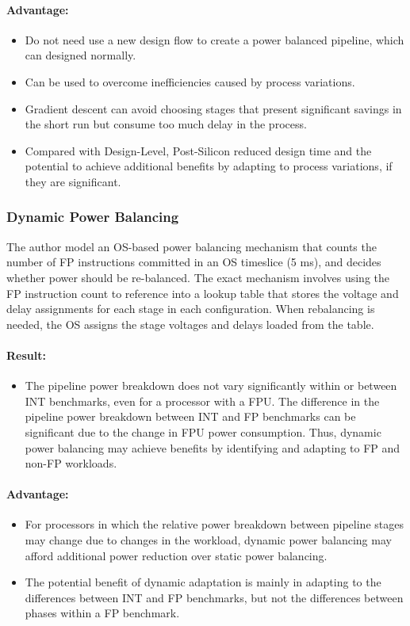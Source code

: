 \documentclass{article}
\begin{document}
\paragraph{Advantage:}
\begin{itemize}
    \item Do not need use a new design flow to create a power balanced pipeline, which can designed normally.
    \item Can be used to overcome inefficiencies caused by process variations.
    \item Gradient descent can avoid choosing stages that present significant savings in the short run but consume too much delay in the process.
    \item Compared with Design-Level, Post-Silicon reduced design time and the potential to achieve additional benefits by adapting to process variations, if they are significant.
\end{itemize}

\subsubsection{Dynamic Power Balancing}
The author model an OS-based power balancing mechanism that counts the number of FP instructions committed in an OS timeslice (5 ms), and decides whether power should be re-balanced. The exact mechanism involves using the FP instruction count to reference into a lookup table that stores the voltage and delay assignments for each stage in each configuration. When rebalancing is needed, the OS assigns the stage voltages and
delays loaded from the table.
\paragraph{Result:} 
\begin{itemize}
    \item The pipeline power breakdown does not vary significantly within or between INT benchmarks, even for a processor with a FPU. The difference in the pipeline power breakdown between INT and FP benchmarks can be significant due to the change in
    FPU power consumption. Thus, dynamic power balancing may achieve benefits by identifying and adapting to FP and non-FP workloads. 
\end{itemize}

\paragraph{Advantage:}
\begin{itemize}
    \item For processors in which the relative power breakdown between pipeline stages may change due to changes in the workload, dynamic power balancing may afford additional power reduction over static power balancing.
    \item The potential benefit of dynamic adaptation is mainly in adapting to the
    differences between INT and FP benchmarks, but not the differences between phases within a FP benchmark.
\end{itemize}
\end{document}
